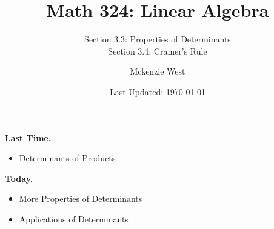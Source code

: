 \documentclass{beamer}
\theoremstyle{definition}
\begin{document}
	\title{Math 324: Linear Algebra}
	\subtitle{Section 3.3: Properties of Determinants\\
	Section 3.4: Cramer's Rule}
	\author{Mckenzie West}
	\date{Last Updated: \today}
\begin{frame}
\maketitle
\end{frame}

\begin{frame}{\insertframenumber}
	\begin{block}{\textbf{Last Time.}}
	\begin{itemize}[label=--]
		\item Determinants of Products
	\end{itemize}
	\end{block}
	\begin{block}{\textbf{Today.}}
		\begin{itemize}[label=--]
			\item More Properties of Determinants
			\item Applications of Determinants
		\end{itemize}
	\end{block}
\end{frame}
\end{document}
